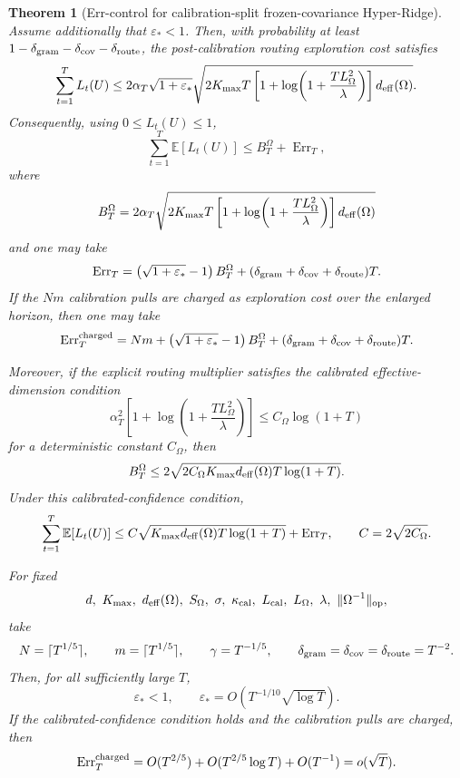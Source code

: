 \documentclass{article} %
\newtheorem{theorem}{Theorem}
\begin{document}
\begin{theorem}[Err-control for calibration-split frozen-covariance Hyper-Ridge]
Assume additionally that \(\varepsilon_*<1\).  Then, with probability at least
\(1-\delta_{\rm gram}-\delta_{\rm cov}-\delta_{\rm route}\), the
post-calibration routing exploration cost satisfies
\[
\sum_{t=1}^T L_t(U)
\le
2\alpha_T\sqrt{1+\varepsilon_*}
\sqrt{
2K_{\max}T
\left[
1+\log\!\left(1+\frac{TL_\Omega^2}{\lambda}\right)
\right]
d_{\rm eff}(\Omega)
}.
\]
Consequently, using \(0\le L_t(U)\le1\),
\[
\sum_{t=1}^T\mathbb{E}[L_t(U)]
\le
B_T^\Omega+\operatorname{Err}_T,
\]
where
\[
B_T^\Omega
=
2\alpha_T
\sqrt{
2K_{\max}T
\left[
1+\log\!\left(1+\frac{TL_\Omega^2}{\lambda}\right)
\right]
d_{\rm eff}(\Omega)
}
\]
and one may take
\[
\operatorname{Err}_T
=
\left(\sqrt{1+\varepsilon_*}-1\right)B_T^\Omega
+
(\delta_{\rm gram}+\delta_{\rm cov}+\delta_{\rm route})T.
\]
If the \(Nm\) calibration pulls are charged as exploration cost over the
enlarged horizon, then one may take
\[
\operatorname{Err}_T^{\rm charged}
=
Nm+
\left(\sqrt{1+\varepsilon_*}-1\right)B_T^\Omega
+
(\delta_{\rm gram}+\delta_{\rm cov}+\delta_{\rm route})T.
\]

Moreover, if the explicit routing multiplier satisfies the calibrated
effective-dimension condition
\[
\alpha_T^2
\left[
1+\log\!\left(1+\frac{TL_\Omega^2}{\lambda}\right)
\right]
\le
C_\Omega\log(1+T)
\]
for a deterministic constant \(C_\Omega\), then
\[
B_T^\Omega
\le
2\sqrt{
2C_\Omega K_{\max}d_{\rm eff}(\Omega)T\log(1+T)
}.
\]
Under this calibrated-confidence condition,
\[
\sum_{t=1}^T\mathbb{E}[L_t(U)]
\le
C
\sqrt{
K_{\max}d_{\rm eff}(\Omega)T\log(1+T)
}
+
\operatorname{Err}_T,
\qquad
C=2\sqrt{2C_\Omega}.
\]

For fixed
\[
d,\ K_{\max},\ d_{\rm eff}(\Omega),\ S_\Omega,\ \sigma,\ \kappa_{\rm cal},\
L_{\rm cal},\ L_\Omega,\ \lambda,\ \|\Omega^{-1}\|_{\mathrm{op}},
\]
take
\[
N=\lceil T^{1/5}\rceil,
\qquad
m=\lceil T^{1/5}\rceil,
\qquad
\gamma=T^{-1/5},
\qquad
\delta_{\rm gram}=\delta_{\rm cov}=\delta_{\rm route}=T^{-2}.
\]
Then, for all sufficiently large \(T\),
\[
\varepsilon_*<1,
\qquad
\varepsilon_*
=
O\!\left(T^{-1/10}\sqrt{\log T}\right).
\]
If the calibrated-confidence condition holds and the calibration pulls are
charged, then
\[
\operatorname{Err}_T^{\rm charged}
=
O(T^{2/5})
+
O(T^{2/5}\log T)
+
O(T^{-1})
=
o(\sqrt{T}).
\]
\end{theorem}
\end{document}
